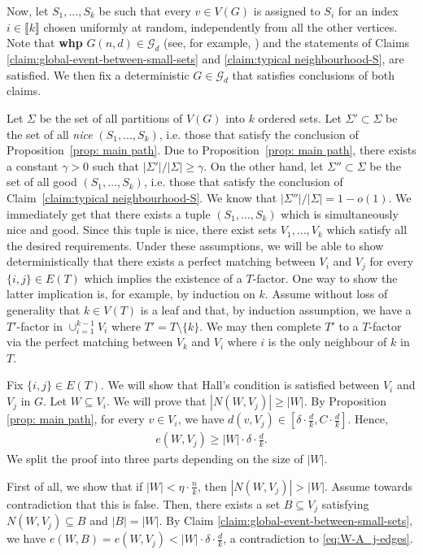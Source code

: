 \documentclass[notitlepage]{scrartcl}
\newcommand{\br}[1]{\llbracket{#1}\rrbracket}
\begin{document}
Now, let $S_1,\ldots, S_k$ be such that every $v\in V(G)$ is assigned to $S_i$ for an index $i\in \br{k}$ chosen uniformly at random, independently from all the other vertices. Note that \textbf{whp} $G(n,d)\in \mathcal{G}_d$ (see, for example, \cite{W99}) and the statements of Claims \ref{claim:global-event-between-small-sets} and \ref{claim:typical neighbourhood-S}, are satisfied. We then fix a deterministic $G\in \mathcal{G}_d$ that satisfies conclusions of both claims.

Let $\Sigma$ be the set of all partitions of $V(G)$ into $k$ ordered sets. Let $\Sigma'\subset\Sigma$ be the set of all \emph{nice} $(S_1,\ldots,S_k)$, i.e. those that satisfy the conclusion of Proposition~\ref{prop: main path}. Due to Proposition~\ref{prop: main path}, there exists a constant $\gamma>0$ such that $|\Sigma'|/|\Sigma|\geq\gamma$. On the other hand, let $\Sigma''\subset\Sigma$ be the set of all good $(S_1,\ldots,S_k)$, i.e. those that satisfy the conclusion of Claim~\ref{claim:typical neighbourhood-S}. We know that $|\Sigma''|/|\Sigma|=1-o(1)$. We immediately get that there exists a tuple $(S_1,\ldots,S_k)$ which is simultaneously nice and good. Since this tuple is nice,
there exist sets $V_1, \dots, V_k$ which satisfy all the desired requirements. Under these assumptions, we will be able to show deterministically that there exists a perfect matching between $V_i$ and $V_j$ for every $\{i,j\} \in E(T)$ which implies the existence of a $T$-factor. One way to show the latter implication is, for example, by induction on $k$. Assume without loss of generality that $k \in V(T)$ is a leaf and that, by induction assumption, we have a $T'$-factor in $\cup_{i=1}^{k-1} V_i$ where $T' = T \setminus \{k\}$. We may then complete $T'$ to a $T$-factor via the perfect matching between $V_k$ and $V_i$ where $i$ is the only neighbour of $k$ in $T$.

Fix $\{i,j\} \in E(T)$. We will show that Hall's condition is satisfied between $V_i$ and $V_j$ in $G$. Let $W \subseteq V_i$. We will prove that $|N(W, V_j)| \ge |W|$. By Proposition \ref{prop: main path}, for every $v \in V_i$, we have $d(v, V_j) \in \left[\delta \cdot \frac{d}{k}, C \cdot \frac{d}{k}\right]$. Hence, 
\begin{align}\label{eq:W-A_j-edges}
    e(W, V_j) \ge |W| \cdot \delta \cdot \frac{d}{k}.
\end{align}
We split the proof into three parts depending on the size of $|W|$.

First of all, we show that if $|W| < \eta \cdot \frac{n}{k}$, then $|N(W, V_j)| > |W|$. Assume towards contradiction that this is false. Then, there exists a set $B \subseteq V_j$ satisfying $N(W, V_j) \subseteq B$ and $|B| = |W|$. By Claim \ref{claim:global-event-between-small-sets}, we have $e(W, B) = e(W, V_j) < |W| \cdot \delta \cdot \frac{d}{k}$, a contradiction to \eqref{eq:W-A_j-edges}.
\end{document}
